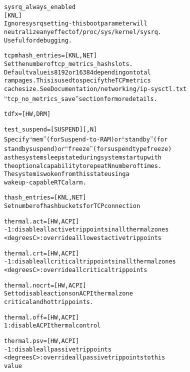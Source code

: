 \documentclass[a4paper,8pt,english]{sphinxmanual}
\begin{document}
\begin{alltt}
        sysrq\_always\_enabled
                        {[}KNL{]}
                        Ignore sysrq setting - this boot parameter will
                        neutralize any effect of /proc/sys/kernel/sysrq.
                        Useful for debugging.

        tcpmhash\_entries= {[}KNL,NET{]}
                        Set the number of tcp\_metrics\_hash slots.
                        Default value is 8192 or 16384 depending on total
                        ram pages. This is used to specify the TCP metrics
                        cache size. See Documentation/networking/ip-sysctl.txt
                        ``tcp\_no\_metrics\_save'' section for more details.

        tdfx=           {[}HW,DRM{]}

        test\_suspend=   {[}SUSPEND{]}{[},N{]}
                        Specify ``mem'' (for Suspend-to-RAM) or ``standby'' (for
                        standby suspend) or ``freeze'' (for suspend type freeze)
                        as the system sleep state during system startup with
                        the optional capability to repeat N number of times.
                        The system is woken from this state using a
                        wakeup-capable RTC alarm.

        thash\_entries=  {[}KNL,NET{]}
                        Set number of hash buckets for TCP connection

        thermal.act=    {[}HW,ACPI{]}
                        -1: disable all active trip points in all thermal zones
                        \textless{}degrees C\textgreater{}: override all lowest active trip points

        thermal.crt=    {[}HW,ACPI{]}
                        -1: disable all critical trip points in all thermal zones
                        \textless{}degrees C\textgreater{}: override all critical trip points

        thermal.nocrt=  {[}HW,ACPI{]}
                        Set to disable actions on ACPI thermal zone
                        critical and hot trip points.

        thermal.off=    {[}HW,ACPI{]}
                        1: disable ACPI thermal control

        thermal.psv=    {[}HW,ACPI{]}
                        -1: disable all passive trip points
                        \textless{}degrees C\textgreater{}: override all passive trip points to this
                        value


\end{alltt}
\end{document}
